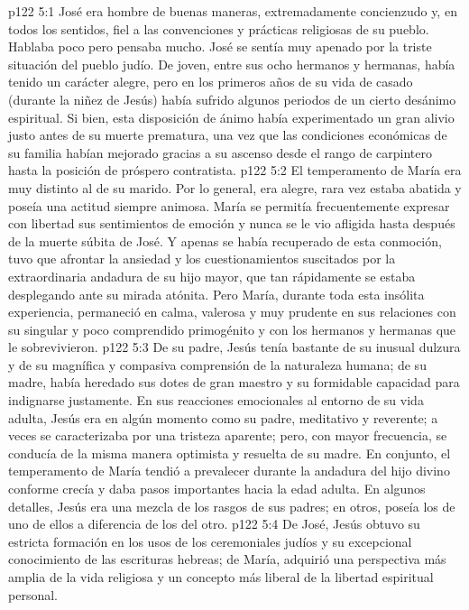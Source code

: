 \vs p122 5:1 José era hombre de buenas maneras, extremadamente concienzudo y, en todos los sentidos, fiel a las convenciones y prácticas religiosas de su pueblo. Hablaba poco pero pensaba mucho. José se sentía muy apenado por la triste situación del pueblo judío. De joven, entre sus ocho hermanos y hermanas, había tenido un carácter alegre, pero en los primeros años de su vida de casado (durante la niñez de Jesús) había sufrido algunos periodos de un cierto desánimo espiritual. Si bien, esta disposición de ánimo había experimentado un gran alivio justo antes de su muerte prematura, una vez que las condiciones económicas de su familia habían mejorado gracias a su ascenso desde el rango de carpintero hasta la posición de próspero contratista.
\vs p122 5:2 El temperamento de María era muy distinto al de su marido. Por lo general, era alegre, rara vez estaba abatida y poseía una actitud siempre animosa. María se permitía frecuentemente expresar con libertad sus sentimientos de emoción y nunca se le vio afligida hasta después de la muerte súbita de José. Y apenas se había recuperado de esta conmoción, tuvo que afrontar la ansiedad y los cuestionamientos suscitados por la extraordinaria andadura de su hijo mayor, que tan rápidamente se estaba desplegando ante su mirada atónita. Pero María, durante toda esta insólita experiencia, permaneció en calma, valerosa y muy prudente en sus relaciones con su singular y poco comprendido primogénito y con los hermanos y hermanas que le sobrevivieron.
\vs p122 5:3 De su padre, Jesús tenía bastante de su inusual dulzura y de su magnífica y compasiva comprensión de la naturaleza humana; de su madre, había heredado sus dotes de gran maestro y su formidable capacidad para indignarse justamente. En sus reacciones emocionales al entorno de su vida adulta, Jesús era en algún momento como su padre, meditativo y reverente; a veces se caracterizaba por una tristeza aparente; pero, con mayor frecuencia, se conducía de la misma manera optimista y resuelta de su madre. En conjunto, el temperamento de María tendió a prevalecer durante la andadura del hijo divino conforme crecía y daba pasos importantes hacia la edad adulta. En algunos detalles, Jesús era una mezcla de los rasgos de sus padres; en otros, poseía los de uno de ellos a diferencia de los del otro.
\vs p122 5:4 De José, Jesús obtuvo su estricta formación en los usos de los ceremoniales judíos y su excepcional conocimiento de las escrituras hebreas; de María, adquirió una perspectiva más amplia de la vida religiosa y un concepto más liberal de la libertad espiritual personal.

